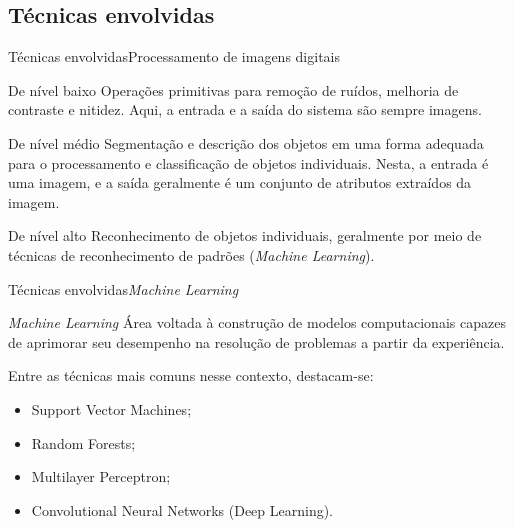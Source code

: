 \documentclass{beamer}
\begin{document}
    \subsection{Técnicas envolvidas}

        \begin{frame}{Técnicas envolvidas}{Processamento de imagens digitais}
            \begin{block}{De nível baixo}
                Operações primitivas para remoção de ruídos, melhoria de
                contraste e nitidez. Aqui, a entrada e a saída
                do sistema são sempre imagens.
            \end{block}
            \begin{block}{De nível médio}
                Segmentação e descrição dos objetos em uma forma 
                adequada para o processamento e classificação de objetos individuais.
                Nesta, a entrada é uma imagem, e a saída geralmente é um
                conjunto de atributos extraídos da imagem.
            \end{block}
            \begin{block}{De nível alto}
                Reconhecimento de objetos individuais,
                geralmente por meio de técnicas de reconhecimento de padrões (\emph{Machine Learning}). 
            \end{block}
        \end{frame}

        \begin{frame}{Técnicas envolvidas}{\emph{Machine Learning}}
            
            \begin{block}{\emph{Machine Learning}}
                Área voltada à construção de modelos computacionais capazes de 
                aprimorar seu desempenho na resolução de problemas a partir da experiência.
            \end{block}
            
            \vspace{.3cm}

            \pause
        
            Entre as técnicas mais comuns nesse contexto, destacam-se:
            \begin{itemize}
                \item<3-> Support Vector Machines;
                \item<4-> Random Forests;
                \item<5-> Multilayer Perceptron;
                \item<6-> Convolutional Neural Networks (Deep Learning).
            \end{itemize}
        
        \end{frame}
\end{document}
